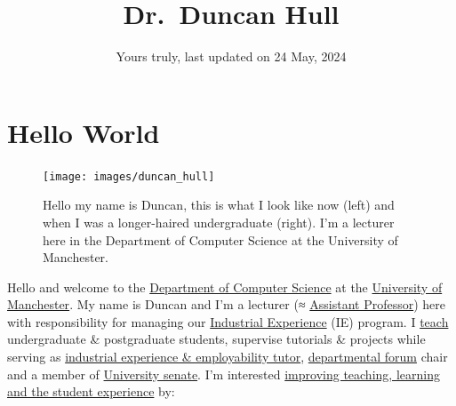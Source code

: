 \documentclass[
  12pt,
]{book}
\title{Dr.~Duncan Hull}
\author{Yours truly, last updated on 24 May, 2024}
\date{}
\begin{document}
\maketitle

{
\setcounter{tocdepth}{1}
\tableofcontents
}
\hypertarget{hello-world}{%
\chapter*{Hello World}\label{hello-world}}

\begin{figure}

{\centering \texttt{[image: images/duncan\_hull]} 

}

\caption{Hello my name is Duncan, this is what I look like now (left) and when I was a longer-haired undergraduate (right). I'm a lecturer here in the Department of Computer Science at the University of Manchester.}\label{fig:unsplashed-fig}
\end{figure}

Hello and welcome to the \href{https://www.cs.manchester.ac.uk/}{Department of Computer Science} at the \href{https://www.manchester.ac.uk}{University of Manchester}. My name is Duncan and I'm a lecturer (≈ \href{https://en.wikipedia.org/wiki/Assistant_professor}{Assistant Professor}) here with responsibility for managing our \href{https://www.cs.manchester.ac.uk/study/undergraduate/industrial-experience/}{Industrial Experience} (IE) program. I \href{https://personalpages.manchester.ac.uk/staff/duncan.hull/teaching.html}{teach} undergraduate \& postgraduate students, supervise tutorials \& projects while serving as \href{http://studentnet.cs.manchester.ac.uk/employment/placement/}{industrial experience \& employability tutor}, \href{https://bit.ly/cs-departmental-forum}{departmental forum} chair and a member of \href{https://www.manchester.ac.uk/discover/governance/structure/senate/}{University senate}. I'm interested \href{https://personalpages.manchester.ac.uk/staff/duncan.hull/research.html}{improving teaching, learning and the student experience} by:
\end{document}

